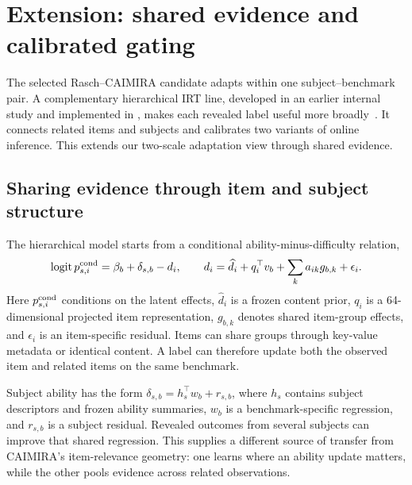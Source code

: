 \section{Extension: shared evidence and calibrated gating}
\label{sec:extensions}
The selected Rasch--CAIMIRA candidate adapts within one subject--benchmark pair. A complementary hierarchical IRT line, developed in an earlier internal study and implemented in , makes each revealed label useful more broadly~\citep{release}. It connects related items and subjects and calibrates two variants of online inference. This extends our two-scale adaptation view through shared evidence.

\subsection{Sharing evidence through item and subject structure}
The hierarchical model starts from a conditional ability-minus-difficulty relation,
\begin{equation}
 \operatorname{logit} p_{s,i}^{\rm cond}=\beta_b+\delta_{s,b}-d_i,
 \qquad
 d_i=\widehat d_i+q_i^\top v_b+\sum_k a_{ik}g_{b,k}+\epsilon_i.
 \label{eq:hierarchical}
\end{equation}
Here $p_{s,i}^{\rm cond}$ conditions on the latent effects, $\widehat d_i$ is a frozen content prior, $q_i$ is a 64-dimensional projected item representation, $g_{b,k}$ denotes shared item-group effects, and $\epsilon_i$ is an item-specific residual. Items can share groups through key-value metadata or identical content. A label can therefore update both the observed item and related items on the same benchmark.

Subject ability has the form $\delta_{s,b}=h_s^\top w_b+r_{s,b}$, where $h_s$ contains subject descriptors and frozen ability summaries, $w_b$ is a benchmark-specific regression, and $r_{s,b}$ is a subject residual. Revealed outcomes from several subjects can improve that shared regression. This supplies a different source of transfer from CAIMIRA's item-relevance geometry: one learns where an ability update matters, while the other pools evidence across related observations.

